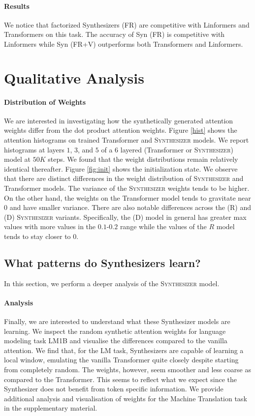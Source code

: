 \paragraph{Results} We notice that factorized Synthesizers (FR) are competitive with Linformers and Transformers on this task. The accuracy of Syn (FR) is competitive with Linformers while Syn (FR+V) outperforms both Transformers and Linformers.

\section{Qualitative Analysis}

\paragraph{Distribution of Weights} We are interested in investigating how the synthetically generated attention weights differ from the dot product attention weights. Figure \ref{hist} shows the attention histograms on trained Transformer and \textsc{Synthesizer} models. We report histograms at layers $1$, $3$, and $5$ of a 6 layered (Transformer or \textsc{Synthesizer}) model at $50K$ steps. We found that the weight distributions remain relatively identical thereafter. Figure \ref{fig:init} shows the initialization state. We observe that there are distinct differences in the weight distribution of \textsc{Synthesizer} and Transformer models. The variance of the \textsc{Synthesizer} weights tends to be higher. On the other hand, the weights on the Transformer model tends to gravitate near $0$ and have smaller variance. There are also notable differences across the (R) and (D) \textsc{Synthesizer} variants. Specifically, the (D) model in general has greater max values with more values in the $0.1$-$0.2$ range while the values of the $R$ model tends to stay closer to $0$.

\subsection{What patterns do Synthesizers learn?} In this section, we perform a deeper analysis of the \textsc{Synthesizer} model.

\paragraph{Analysis} Finally, we are interested to understand what these Synthesizer models are learning. We inspect the random synthetic attention weights for language modeling task LM1B and visualise the differences compared to the vanilla attention. We find that, for the LM task, Synthesizers are capable of learning a local window, emulating the vanilla Transformer quite closely despite starting from completely random. The weights, however, seem smoother and less coarse as compared to the Transformer. This seems to reflect what we expect since the Synthesizer does not benefit from token specific information. We provide additional analysis and visualisation of weights for the Machine Translation task in the supplementary material.

